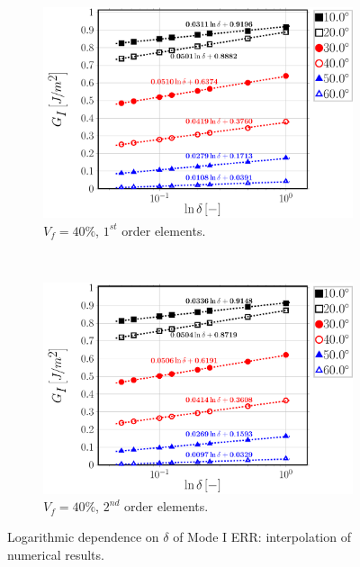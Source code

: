 \begin{figure}[!h]
    \begin{subfigure}[b]{0.48\textwidth}
        \includegraphics[width=\textwidth]{paperA/Vf40-free-1st-semilogvsDelta-GI.pdf}
       \caption{$V_{f}=40\%$, $1^{st}$ order elements.}
    \end{subfigure}
    ~
    \begin{subfigure}[b]{0.48\textwidth}
        \includegraphics[width=\textwidth]{paperA/Vf40-free-2nd-semilogvsDelta-GI.pdf}
       \caption{$V_{f}=40\%$, $2^{nd}$ order elements.}
    \end{subfigure}

\caption{Logarithmic dependence on $\delta$ of Mode I ERR: interpolation of numerical results.}\label{chap3:paperA:fig:gIinterp}
\end{figure}

